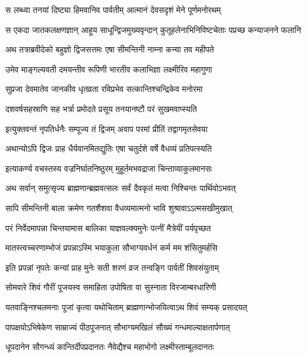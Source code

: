 \begin{center}
\twolineshloka
{स लब्ध्वा तनयां दिष्ट्या हिमवानिव पार्वतीम्}
{आत्मानं देवसदृशं मेने पूर्णमनोरथम्} %

\fourlineindentedshloka
{स एकदा जातकलक्षणज्ञान्}
{आहूय साधून्द्विजमुख्यवृन्दान्}
{कुतूहलेनाभिनिविष्टचेताः}
{पप्रच्छ कन्याजनने फलानि} %

\twolineshloka
{अथ तत्राब्रवीदेको बहुज्ञो द्विजसत्तमः}
{एषा सीमन्तिनी नाम्ना कन्या तव महीपते} %

\twolineshloka
{उमेव माङ्गल्यवती दमयन्तीव रूपिणी}
{भारतीव कलाभिज्ञा लक्ष्मीरिव महागुणा} %

\twolineshloka
{सुप्रजा देवमातेव जानकीव धृतव्रता}
{रविप्रभेव सत्कान्तिश्चन्द्रिकेव मनोरमा} %

\twolineshloka
{दशवर्षसहस्राणि सह भर्त्रा प्रमोदते}
{प्रसूय तनयानष्टौ परं सुखमवाप्स्यति} %

\twolineshloka
{इत्युक्तवन्तं नृपतिर्धनैः सम्पूज्य तं द्विजम्}
{अवाप परमां प्रीतिं तद्वागमृतसेवया} %

\twolineshloka
{अथान्योऽपि द्विजः प्राह धैर्यवानमितद्युतिः}
{एषा चतुर्दशे वर्षे वैधव्यं प्रतिपत्स्यति} %

\twolineshloka
{इत्याकर्ण्य वचस्तस्य वज्रनिर्घातनिष्ठुरम्}
{मुहूर्तमभवद्राजा चिन्ताव्याकुलमानसः} %

\twolineshloka
{अथ सर्वान् समुत्सृज्य ब्राह्मणान्ब्रह्मवत्सलः}
{सर्वं दैवकृतं मत्वा निश्चिन्तः पार्थिवोऽभवत्} %

\twolineshloka
{सापि सीमन्तिनी बाला क्रमेण गतशैशवा}
{वैधव्यमात्मनो भावि शुश्रावाऽऽत्मसखीमुखात्} %

\twolineshloka
{परं निर्वेदमापन्ना चिन्तयामास बालिका}
{याज्ञवल्क्यमुनेः पत्नीं मैत्रेयीं पर्यपृच्छत} %

\twolineshloka
{मातस्त्वच्चरणाम्भोजं प्रपन्नाऽस्मि भयाकुला}
{सौभाग्यवर्धनं कर्म मम शंसितुमर्हसि} %

\twolineshloka
{इति प्रपन्नां नृपतेः कन्यां प्राह मुनेः सती}
{शरणं व्रज तन्वङ्गि पार्वतीं शिवसंयुताम्} %

\twolineshloka
{सोमवारे शिवं गौरीं पूजयस्व समाहिता}
{उपोषिता वा सुस्नाता विरजाम्बरधारिणी} %

\twolineshloka
{यतवाङ्निश्चलमनाः पूजां कृत्वा यथोचिताम्}
{ब्राह्मणान्भोजयित्वाऽथ शिवं सम्यक् प्रसादयत्} %

\twolineshloka
{पापक्षयोऽभिषेकेण साम्राज्यं पीठपूजनात्}
{सौभाग्यमखिलं सौख्यं गन्धमाल्याक्षतार्पणात्} %

\twolineshloka
{धूपदानेन सौगन्ध्यं कान्तिर्दीपप्रदानतः}
{नैवेद्यैश्च महाभोगो लक्ष्मीस्ताम्बूलदानतः} %


\end{center}
